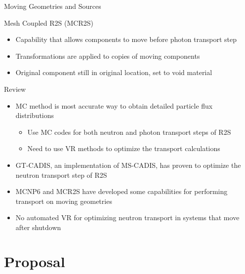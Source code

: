 \documentclass{beamer}
\begin{document}
\begin{frame}{Moving Geometries and Sources}
		\begin{block}{Mesh Coupled R2S (MCR2S)}
	\begin{itemize}
		\item{Capability that allows components to move before photon
			transport step}
		\item{Transformations are applied to copies of moving
			components}
		\item{Original component still in original location, set to void material}
	\end{itemize}
		\end{block}
\end{frame}

\begin{frame}{Review}
	\begin{itemize}
		\item{MC method is most accurate way to obtain detailed
			particle flux distributions}
			\begin{itemize}
          	  	  \item{Use MC codes for both neutron and photon transport steps
          	  	  	of R2S}
          	  	  \item{Need to use VR methods to optimize the transport
          	  	  	calculations}
          		\end{itemize}
		\item{GT-CADIS, an implementation of MS-CADIS,  has proven to optimize the neutron transport
			step of R2S}
		\item{MCNP6 and MCR2S have developed some capabilities for
			performing transport on moving geometries}
		\item{No automated VR for optimizing neutron transport
			in systems that move after shutdown}
	\end{itemize}

\end{frame}



\section{Proposal}
\end{document}
